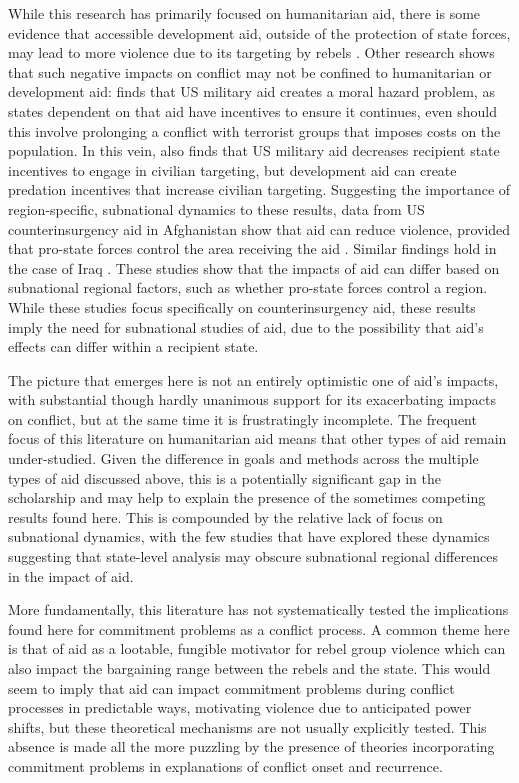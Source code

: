 \documentclass[12pt, letterpaper]{article}
\renewcommand{\cite}{\citep}
\begin{document}
While this research has primarily focused on humanitarian aid, there is some evidence that accessible development aid, outside of the protection of state forces, may lead to more violence due to its targeting by rebels \cite{findley2011localized}. Other research shows that such negative impacts on conflict may not be confined to humanitarian or development aid: \citet{bapat2011} finds that US military aid creates a moral hazard problem, as states dependent on that aid have incentives to ensure it continues, even should this involve prolonging a conflict with terrorist groups that imposes costs on the population. In this vein, \citet{jadoon2018persuasion} also finds that US military aid decreases recipient state incentives to engage in civilian targeting, but development aid can create predation incentives that increase civilian targeting. Suggesting the importance of region-specific, subnational dynamics to these results, data from US counterinsurgency aid in Afghanistan show that aid can reduce violence, provided that pro-state forces control the area receiving the aid \cite{sexton2016aid}. Similar findings hold in the case of Iraq \cite{berman2013modest}. These studies show that the impacts of aid can differ based on subnational regional factors, such as whether pro-state forces control a region. While these studies focus specifically on counterinsurgency aid, these results imply the need for subnational studies of aid, due to the possibility that aid’s effects can differ within a recipient state.

The picture that emerges here is not an entirely optimistic one of aid’s impacts, with substantial though hardly unanimous support for its exacerbating impacts on conflict, but at the same time it is frustratingly incomplete. The frequent focus of this literature on humanitarian aid means that other types of aid remain under-studied. Given the difference in goals and methods across the multiple types of aid discussed above, this is a potentially significant gap in the scholarship and may help to explain the presence of the sometimes competing results found here. This is compounded by the relative lack of focus on subnational dynamics, with the few studies that have explored these dynamics suggesting that state-level analysis may obscure subnational regional differences in the impact of aid.

More fundamentally, this literature has not systematically tested the implications found here for commitment problems as a conflict process. A common theme here is that of aid as a lootable, fungible motivator for rebel group violence which can also impact the bargaining range between the rebels and the state. This would seem to imply that aid can impact commitment problems \cite{fearon1995rationalist} during conflict processes in predictable ways, motivating violence due to anticipated power shifts, but these theoretical mechanisms are not usually explicitly tested. This absence is made all the more puzzling by the presence of theories incorporating commitment problems in explanations of conflict onset and recurrence. 
\end{document}
